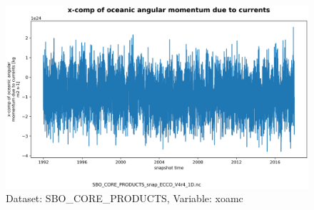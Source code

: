\begin{figure}[H]
\centering
\includegraphics[scale=0.55]{../images/plots/v4r4/oneD_plots/SBO_Core_Products/xoamc.png}
\caption{Dataset: SBO\_CORE\_PRODUCTS, Variable: xoamc}
\label{tab:table-SBO_CORE_PRODUCTS_xoamc-Plot}
\end{figure}
\newpage
\pagebreak
